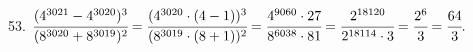 53. $\cfrac{(4^{3021}-4^{3020})^3}{(8^{3020}+8^{3019})^2}=\cfrac{(4^{3020}\cdot(4-1))^3}{(8^{3019}\cdot(8+1))^2}=
\cfrac{4^{9060}\cdot27}{8^{6038}\cdot81}=\cfrac{2^{18120}}{2^{18114}\cdot3}=\cfrac{2^6}{3}=\cfrac{64}{3}.$\\

